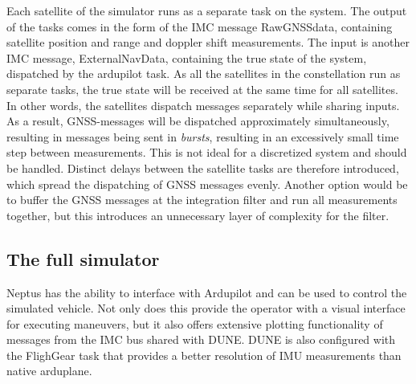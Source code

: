     Each satellite of the simulator runs as a separate task on the system. The output of the tasks comes in the form of the IMC message RawGNSSdata, containing satellite position and range and doppler shift measurements. The input is another IMC message, ExternalNavData, containing the true state of the system, dispatched by the ardupilot task. As all the satellites in the constellation run as separate tasks, the true state will be received at the same time for all satellites. In other words, the satellites dispatch messages separately while sharing inputs. As a result, GNSS-messages will be dispatched approximately simultaneously, resulting in messages being sent in \textit{bursts}, resulting in an excessively small time step between measurements. This is not ideal for a discretized system and should be handled. Distinct delays between the satellite tasks are therefore introduced, which spread the dispatching of GNSS messages evenly. Another option would be to buffer the GNSS messages at the integration filter and run all measurements together, but this introduces an unnecessary layer of complexity for the filter. \\

\subsection{The full simulator}
    Neptus has the ability to interface with Ardupilot and can be used to control the simulated vehicle. Not only does this provide the operator with a visual interface for executing maneuvers, but it also offers extensive plotting functionality of messages from the IMC bus shared with DUNE. DUNE is also configured with the FlighGear task that provides a better resolution of IMU measurements than native arduplane.

